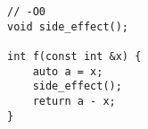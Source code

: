 \begin{lstlisting}[title=\href{https://godbolt.org/z/ybbqrK}{\texttt{godbolt.org/z/ybbqrK}}]
// -O0
void side_effect();

int f(const int &x) {
    auto a = x;
    side_effect();
    return a - x;
}
\end{lstlisting}
